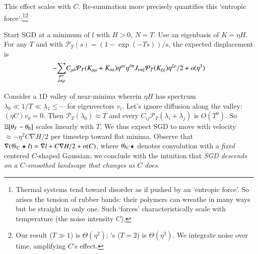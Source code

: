 This effect scales with $C$.  
%
%
Re-summation more precisely quantifies this `entropic force':\footnote{
    Thermal systems tend toward disorder as if pushed by an
    `entropic force'.
    So arises the tension of rubber
    bands: their polymers can wreathe in
    many ways but be straight in only one.
    Such `forces' characteristically 
    scale with
    temperature (the noise intensity $C$).
}\footnote{
    Our result ($T\gg 1$) is $\Theta(\eta^2)$; \cite{ya19b}'s
    ($T=2$) is $\Theta(\eta^3)$.  We
    integrate noise over time, amplifying $C$'s
    effect. 
}
%
\begin{cor}\label{cor:entropic}%
    Start SGD at a minimum of $l$ with $H>0$, $N=T$.  Use
    an eigenbasis of $K=\eta H$.  
    For any $T$ and
    with ${\mathcal P}_T(s) = (1 - \exp(-Ts))/s$,
    the 
    expected displacement is
    $$
        -
        {\sum_{\substack{\mu\nu    \\ {\acute{o}}\pi\rho}}}
            C_{\mu{\acute{o}}}
            {{\mathcal P}_T(K_{\mu\mu} + K_{{\acute{o}}{\acute{o}}})}
            \eta^{\mu\nu}\eta^{{\acute{o}}\pi}
            J_{\nu\pi\xi}
            {{\mathcal P}_T(K_{\xi\xi})}\eta^{\xi\rho}/2
        + o(\eta^3)
    $$
\end{cor}

Consider a 1D valley of near-minima wherein $\eta H$ has spectrum
$\lambda_0 \ll 1/T \ll \lambda_1 \leq \cdots$ for eigenvectors
$v_i$.  Let's ignore diffusion along the valley: $(\eta C) v_0 =
0$.
%
Then ${\mathcal P}_T(\lambda_0)\approx T$ and every
$C_{ij}{\mathcal P}_T(\lambda_i+\lambda_j)$ is $O(T^0)$.  So $\mathbb{E}[\theta_T-\theta_0]$
scales linearly with $T$.  We thus expect SGD to move with
velocity $\approx -\eta^2 C\nabla H/2$ per timestep toward flat minima.  
Observe that $\nabla ({\frak G}_C \star l) = \nabla l+C\nabla
H/2 + o(C)$, where ${\frak G}_C \star$ denotes convolution with a
\emph{fixed} centered $C$-shaped Gaussian; we conclude with the
intuition that \emph{SGD descends on a $C$-smoothed landscape that
changes as $C$ does}.  %


